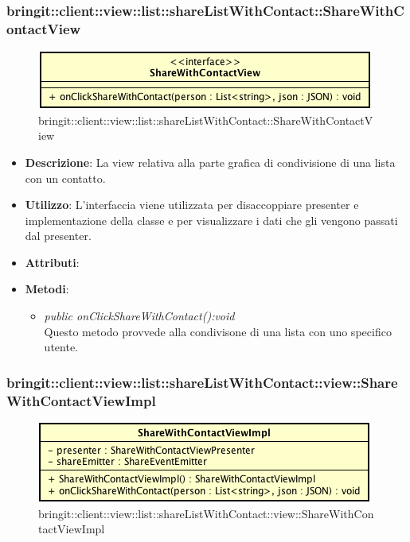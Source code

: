 \subsubsection{bringit::client::view::list::shareListWithContact::ShareWithContactView}

\label{bringit::client::view::list::shareListWithContact::ShareWithContactView}
\begin{figure}[H]
	\centering
	\includegraphics[scale=0.5]{Sezioni/SottosezioniST/img/app/ShareWithContactView.png}
	\caption{bringit::client::view::list::shareListWithContact::ShareWithContactView}
\end{figure}

\begin{itemize}
\item \textbf{Descrizione}: La view relativa alla parte grafica di condivisione di una lista con un contatto.
\item \textbf{Utilizzo}: L'interfaccia viene utilizzata per disaccoppiare presenter e implementazione della classe e per visualizzare i dati che gli vengono passati dal presenter.
\item \textbf{Attributi}: 
\item \textbf{Metodi}:
	\begin{itemize}
	\item \textit{public onClickShareWithContact():void}\\
	Questo metodo provvede alla condivisone di una lista con uno specifico utente.
	\end{itemize}
\end{itemize} 

\subsubsection{bringit::client::view::list::shareListWithContact::view::ShareWithContactViewImpl}

\label{bringit::client::view::list::shareListWithContact::view::ShareWithContactViewImpl}
\begin{figure}[H]
	\centering
	\includegraphics[scale=0.5]{Sezioni/SottosezioniST/img/app/ShareWithContactViewImpl.png}
	\caption{bringit::client::view::list::shareListWithContact::view::ShareWithContactViewImpl}
\end{figure}

